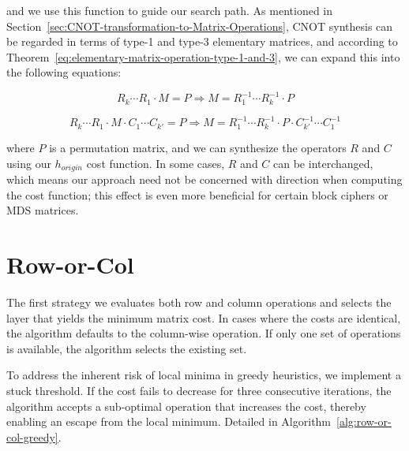 and we use this function to guide our search path. As mentioned in Section~\ref{sec:CNOT-transformation-to-Matrix-Operations}, CNOT synthesis can be regarded in terms of type-1 and type-3 elementary matrices, and according to Theorem~\ref{eq:elementary-matrix-operation-type-1-and-3}, we can expand this into the following equations:

\begin{equation}
	\label{eq:elementary-matrix-left-multiplication}
	R_{k} \cdots R_{1} \cdot M = P \Rightarrow M = R_{1}^{-1} \cdots R_{k}^{-1} \cdot P
\end{equation}

\begin{equation}
	\label{eq:elementary-matrix-left-right-multiplication}
	R_{k} \cdots R_{1} \cdot M \cdot C_{1} \cdots C_{k'} = P \Rightarrow M = R_{1}^{-1} \cdots R_{k}^{-1} \cdot P \cdot C_{k'}^{-1} \cdots C_{1}^{-1}
\end{equation}

where $P$ is a permutation matrix, and we can synthesize the operators $R$ and $C$ using our $h_{origin}$ cost function. In some cases, $R$ and $C$ can be interchanged, which means our approach need not be concerned with direction when computing the cost function; this effect is even more beneficial for certain block ciphers or MDS matrices.

\section{Row-or-Col}
The first strategy we evaluates both row and column operations and selects the layer that yields the minimum matrix cost. In cases where the costs are identical, the algorithm defaults to the column-wise operation. If only one set of operations is available, the algorithm selects the existing set. 

To address the inherent risk of local minima in greedy heuristics, we implement a stuck threshold. If the cost fails to decrease for three consecutive iterations, the algorithm accepts a sub-optimal operation that increases the cost, thereby enabling an escape from the local minimum. Detailed in Algorithm~\ref{alg:row-or-col-greedy}.

